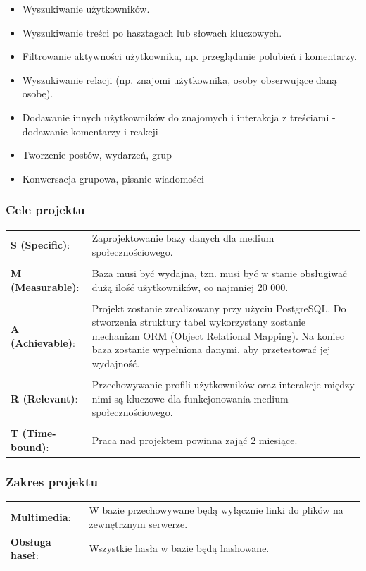 \documentclass{article}
\begin{document}
\begin{itemize}
    \item Wyszukiwanie użytkowników.
    \item Wyszukiwanie treści po hasztagach lub słowach kluczowych.
    \item Filtrowanie aktywności użytkownika, np. przeglądanie polubień i komentarzy.
    \item Wyszukiwanie relacji (np. znajomi użytkownika, osoby obserwujące daną osobę).
    \item Dodawanie innych użytkowników do znajomych i interakcja z treściami - dodawanie komentarzy i reakcji
    \item Tworzenie postów, wydarzeń, grup
    \item Konwersacja grupowa, pisanie wiadomości
\end{itemize}

\subsubsection{Cele projektu}

\begin{tabular}{@{} l p{12cm} @{}}
    \textbf{S (Specific)}: & Zaprojektowanie bazy danych dla medium społecznościowego. \\ \\
    \textbf{M (Measurable)}: & Baza musi być wydajna, tzn. musi być w stanie obsługiwać dużą ilość użytkowników, co najmniej 20 000. \\ \\
    \textbf{A (Achievable)}: & Projekt zostanie zrealizowany przy użyciu PostgreSQL. Do stworzenia struktury tabel wykorzystany zostanie mechanizm ORM (Object Relational Mapping). Na koniec baza zostanie wypełniona danymi, aby przetestować jej wydajność. \\ \\
    \textbf{R (Relevant)}: & Przechowywanie profili użytkowników oraz interakcje między nimi są kluczowe dla funkcjonowania medium społecznościowego. \\ \\
    \textbf{T (Time-bound)}: & Praca nad projektem powinna zająć 2 miesiące.
\end{tabular}

\subsubsection{Zakres projektu}

\begin{tabular}{@{} l p{10cm} @{}}
    \textbf{Multimedia}: & W bazie przechowywane będą wyłącznie linki do plików na zewnętrznym serwerze. \\
    \textbf{Obsługa haseł}: & Wszystkie hasła w bazie będą hashowane.
\end{tabular}
\end{document}
